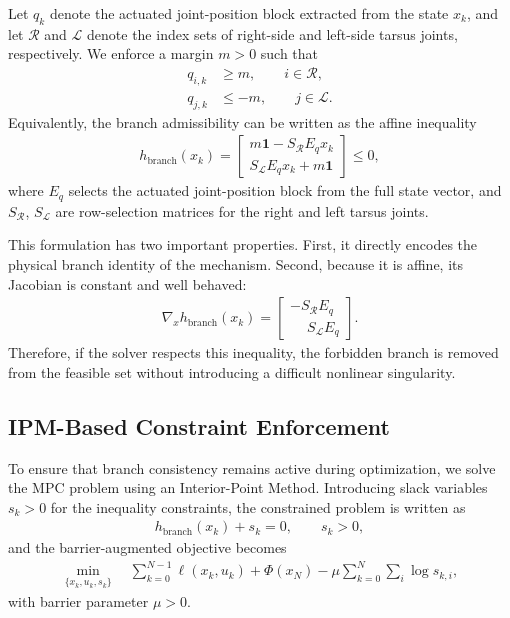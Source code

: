 Let $q_k$ denote the actuated joint-position block extracted from the state $x_k$, and let $\mathcal{R}$ and $\mathcal{L}$ denote the index sets of right-side and left-side tarsus joints, respectively. We enforce a margin $m>0$ such that
\begin{align}
q_{i,k} &\ge m, \qquad i \in \mathcal{R}, \\
q_{j,k} &\le -m, \qquad j \in \mathcal{L}.
\end{align}
Equivalently, the branch admissibility can be written as the affine inequality
\begin{align}
h_{\mathrm{branch}}(x_k) =
\begin{bmatrix}
m\mathbf{1} - S_{\mathcal{R}} E_q x_k \\
S_{\mathcal{L}} E_q x_k + m\mathbf{1}
\end{bmatrix}
\le 0,
\end{align}
where $E_q$ selects the actuated joint-position block from the full state vector, and $S_{\mathcal{R}}$, $S_{\mathcal{L}}$ are row-selection matrices for the right and left tarsus joints.

This formulation has two important properties. First, it directly encodes the physical branch identity of the mechanism. Second, because it is affine, its Jacobian is constant and well behaved:
\begin{align}
\nabla_x h_{\mathrm{branch}}(x_k) =
\begin{bmatrix}
- S_{\mathcal{R}} E_q \\
\phantom{-} S_{\mathcal{L}} E_q
\end{bmatrix}.
\end{align}
Therefore, if the solver respects this inequality, the forbidden branch is removed from the feasible set without introducing a difficult nonlinear singularity.

\subsection{IPM-Based Constraint Enforcement}

To ensure that branch consistency remains active during optimization, we solve the MPC problem using an Interior-Point Method. Introducing slack variables $s_k > 0$ for the inequality constraints, the constrained problem is written as
\begin{align}
h_{\mathrm{branch}}(x_k) + s_k = 0, \qquad s_k > 0,
\end{align}
and the barrier-augmented objective becomes
\begin{align}
\min_{\{x_k,u_k,s_k\}} \quad
\sum_{k=0}^{N-1} \ell(x_k,u_k) + \Phi(x_N)
- \mu \sum_{k=0}^{N} \sum_{i} \log s_{k,i},
\end{align}
with barrier parameter $\mu > 0$.

